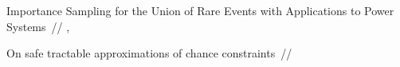 \documentclass[12pt, twoside]{article}
\begin{document}

\begin{thebibliography}{99}


   Importance Sampling for the Union of Rare Events with Applications to Power Systems~//
    \BibJournal{},
	
   On safe tractable approximations of chance constraints~//
    \BibJournal{}
		

 	
\end{thebibliography}

\end{document}
